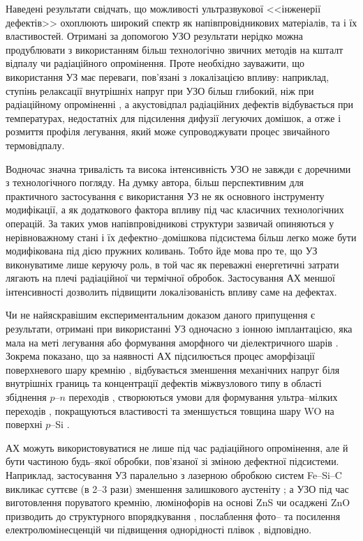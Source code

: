 Наведені результати свідчать, що можливості ультразвукової <<інженерії дефектів>> охоплюють широкий спектр як напівпровідникових матеріалів, та і їх властивостей.
Отримані за допомогою УЗО результати нерідко можна продублювати з використанням більш технологічно звичних методів на кшталт відпалу чи радіаційного опромінення.
Проте необхідно зауважити, що використання УЗ має переваги, пов'язані з локалізацією впливу:
наприклад, ступінь релаксації внутрішніх напруг при УЗО більш глибокий, ніж при радіаційному опроміненні \cite{UST:GeGaAs1990},
а акустовідпал радіаційних дефектів \cite{PodolHivr,UST:OstrovCsI,YOlikh2007TPLr} відбувається при температурах, недостатніх для підсилення дифузії легуючих домішок, а отже і розмиття профіля легування, який може супроводжувати процес звичайного термовідпалу.

Водночас значна тривалість та висока інтенсивність УЗО не завжди є доречними з технологічного погляду.
На думку автора, більш перспективним для практичного застосування є використання УЗ не як основного інструменту модифікації, а як додаткового фактора впливу під час класичних технологічних операцій.
За таких умов напівпровідникові структури зазвичай опиняються у нерівноважному стані і їх дефектно--домішкова підсистема більш легко може бути модифікована під дією пружних коливань.
Тобто йде мова про те, що УЗ виконуватиме лише керуючу роль, в той час як переважні енергетичні затрати
лягають на плечі радіаційної чи термічної обробок.
Застосування  АХ  меншої інтенсивності дозволить підвищити локалізованість впливу саме на дефектах.

Чи не найяскравішим експериментальним доказом даного припущення є результати, отримані при
використанні УЗ одночасно з іонною імплантацією, яка мала на меті легування або формування аморфного чи діелектричного шарів \cite{US:ImplantUFJ2015,US:ImplantUFJ2001,US:ImplantUFJ2008,ROMANYUK2005,Roman2006,RomanyukSST,
YOlikh2005,ROMANJUK2005MatSci,USImplant:JVacSci}.
Зокрема показано, що за наявності АХ
підсилюється процес аморфізації поверхневого шару кремнію \cite{RomanyukSST,US:ImplantUFJ2001},
відбувається зменшення механічних напруг біля внутрішніх границь \cite{US:ImplantUFJ2008,ROMANJUK2005MatSci}
та концентрації дефектів міжвузлового типу в області збіднення $p$--$n$ переходів \cite{YOlikh2005},
створюються умови для формування ультра--мілких переходів \cite{USImplant:JVacSci},
покращуються властивості та зменшується товщина шару WO на поверхні $p$--Si \cite{ROMANYUK2005,Roman2006}.

АХ можуть використовуватися не лише під час радіаційного опромінення, але й бути частиною будь--якої обробки, пов'язаної зі зміною дефектної підсистеми.
Наприклад, застосування УЗ паралельно з лазерною обробкою систем Fe--Si--C викликає суттєве (в 2--3 рази) зменшення залишкового аустеніту \cite{US:FeSiC};
а УЗО під час виготовлення поруватого кремнію, люмінофорів на основі ZnS чи осаджені ZnO призводить до структурного впорядкування \cite{Kalem2000}, послаблення фото-- та посилення електролюмінесценцій \cite{Wang:JLum} чи підвищення однорідності плівок \cite{US:ZnOfilm}, відповідно.



